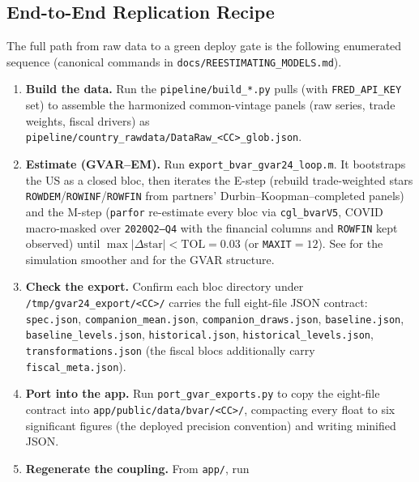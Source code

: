\documentclass[11pt]{article}
\theoremstyle{definition}
\theoremstyle{remark}
\begin{document}
\subsection{End-to-End Replication Recipe}\label{sec:repro:recipe}

The full path from raw data to a green deploy gate is the following enumerated
sequence (canonical commands in \texttt{docs/REESTIMATING\_MODELS.md}).

\begin{enumerate}
  \item \textbf{Build the data.} Run the \texttt{pipeline/build\_*.py} pulls
    (with \texttt{FRED\_API\_KEY} set) to assemble the harmonized
    common-vintage panels (raw series, trade weights, fiscal drivers) as
    \texttt{pipeline/\allowbreak country\_\allowbreak rawdata/\allowbreak DataRaw\_\allowbreak <CC>\_\allowbreak glob.json}.
  \item \textbf{Estimate (GVAR--EM).} Run
    \texttt{export\_bvar\_gvar24\_loop.m}. It bootstraps the US as a closed
    bloc, then iterates the E-step (rebuild trade-weighted stars
    \texttt{ROWDEM}/\texttt{ROWINF}/\texttt{ROWFIN} from partners'
    Durbin--Koopman--completed panels) and the M-step (\texttt{parfor}
    re-estimate every bloc via \texttt{cgl\_bvarV5}, COVID macro-masked over
    \texttt{2020Q2--Q4} with the financial columns and \texttt{ROWFIN} kept
    observed) until $\max|\Delta\text{star}| < \mathrm{TOL}=0.03$ (or
    \texttt{MAXIT}$=12$). See \citet{DurbinKoopman2002} for the simulation
    smoother and \citet{DeesDiMauroPesaranSmith2007} for the GVAR structure.
  \item \textbf{Check the export.} Confirm each bloc directory under
    \texttt{/tmp/gvar24\_export/<CC>/} carries the full eight-file JSON
    contract: \texttt{spec.json}, \texttt{companion\_mean.json},
    \texttt{companion\_draws.json}, \texttt{baseline.json},
    \texttt{baseline\_levels.json}, \texttt{historical.json},
    \texttt{historical\_levels.json}, \texttt{transformations.json} (the fiscal
    blocs additionally carry \texttt{fiscal\_meta.json}).
  \item \textbf{Port into the app.} Run \texttt{port\_gvar\_exports.py} to copy
    the eight-file contract into
    \texttt{app/\allowbreak public/\allowbreak data/\allowbreak bvar/\allowbreak <CC>/},
    compacting every float to six significant figures (the deployed precision
    convention) and writing minified JSON.
  \item \textbf{Regenerate the coupling.} From \texttt{app/}, run

\end{enumerate}
\end{document}
